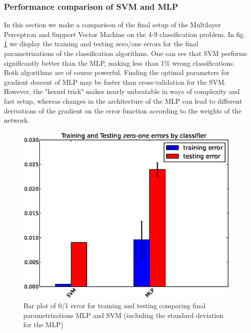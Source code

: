 \subsubsection{Performance comparison of SVM and MLP}
In this section we make a comparison of the final setup of the Multilayer Perceptron and Support Vector Machine on the 4-9 classification problem. In fig. \ref{fig:comparison} we display the training and testing zero/one errors for the final parametrizations of the classification algorithms. One can see that SVM performs significantly better than the MLP, making less than 1\% wrong classifications. Both algorithms are of course powerful. Finding the optimal parameters for gradient descent of MLP may be faster than cross-validation for the SVM. However, the "kernel trick" makes nearly unbeatable in ways of complexity and fast setup, whereas changes in the architecture of the MLP can lead to different derivations of the gradient on the error function according to the weights of the network.
\begin{figure}[!ht]
	\centering
	\includegraphics[width=.7\textwidth]{svm/comparison_bar_plot.eps}
	\caption{Bar plot of 0/1 error for training and testing comparing final parametrizations MLP and SVM (including the standard deviation for the MLP)}	
	\label{fig:comparison}
\end{figure}